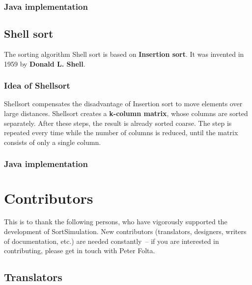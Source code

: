 \documentclass[11pt, a4paper, titlepage, twoside]{article}
\renewcommand{\emph}{\textbf}
\begin{document}
	\subsubsection{Java implementation}
	
	
	
	\subsection{Shell sort}
	
	The sorting algorithm Shell sort is based on \emph{Insertion sort}. It was invented in 1959 by \emph{Donald L. Shell}.
	
	\subsubsection{Idea of Shellsort}
	
	Shellsort compensates the disadvantage of Insertion sort to move elements over large distances. Shellsort creates a \emph{k-column matrix}, whose columns are sorted separately. After these steps, the result is already sorted coarse. The step is repeated every time while the number of columns is reduced, until the matrix consists of only a single column.
	
	\subsubsection{Java implementation}
	
	
	
	\section{Contributors}
	
	This is to thank the following persons, who have vigorously supported the development of SortSimulation. New contributors (translators, designers, writers of documentation, etc.) are needed constantly~-- if you are interested in contributing, please get in touch with Peter Folta.
	
	\subsection{Translators}
	
\end{document}
